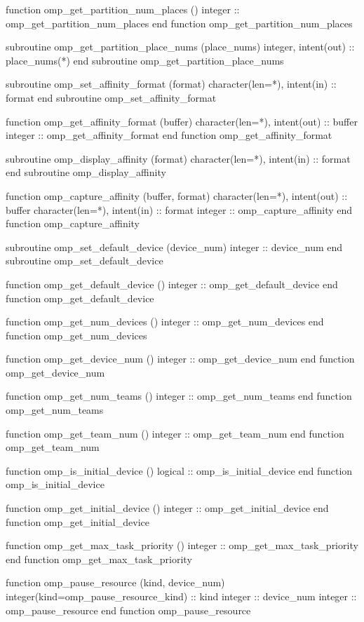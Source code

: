 {\begin{ompfFunction}
    function omp_get_partition_num_places ()
      integer :: omp_get_partition_num_places
    end function omp_get_partition_num_places

    subroutine omp_get_partition_place_nums (place_nums)
      integer, intent(out) :: place_nums(*)
    end subroutine omp_get_partition_place_nums

    subroutine omp_set_affinity_format (format)
      character(len=*), intent(in) :: format
    end subroutine omp_set_affinity_format

    function omp_get_affinity_format (buffer)
      character(len=*), intent(out) :: buffer
      integer :: omp_get_affinity_format
    end function omp_get_affinity_format

    subroutine omp_display_affinity (format)
      character(len=*), intent(in) :: format
    end subroutine omp_display_affinity

    function omp_capture_affinity (buffer, format)
      character(len=*), intent(out) :: buffer
      character(len=*), intent(in) :: format
      integer :: omp_capture_affinity
    end function omp_capture_affinity

    subroutine omp_set_default_device (device_num)
      integer :: device_num
    end subroutine omp_set_default_device

    function omp_get_default_device ()
      integer :: omp_get_default_device
    end function omp_get_default_device

    function omp_get_num_devices ()
      integer :: omp_get_num_devices
    end function omp_get_num_devices

    function omp_get_device_num ()
      integer :: omp_get_device_num
    end function omp_get_device_num

    function omp_get_num_teams ()
      integer :: omp_get_num_teams
    end function omp_get_num_teams

    function omp_get_team_num ()
      integer :: omp_get_team_num
    end function omp_get_team_num

    function omp_is_initial_device ()
      logical :: omp_is_initial_device
    end function omp_is_initial_device

    function omp_get_initial_device ()
      integer :: omp_get_initial_device
    end function omp_get_initial_device

    function omp_get_max_task_priority ()
      integer :: omp_get_max_task_priority
    end function omp_get_max_task_priority

    function omp_pause_resource (kind, device_num)
      integer(kind=omp_pause_resource_kind) :: kind
      integer :: device_num
      integer :: omp_pause_resource
    end function omp_pause_resource


\end{ompfFunction}}
